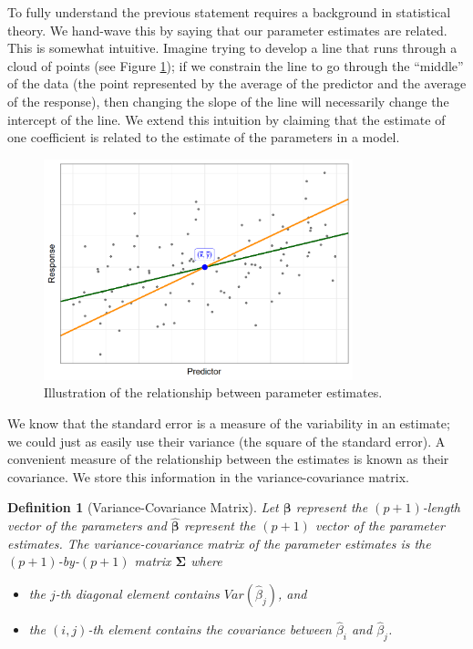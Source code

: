 \documentclass[
]{book}
\providecommand{\tightlist}{%
  \setlength{\itemsep}{0pt}\setlength{\parskip}{0pt}}
\theoremstyle{plain}
\theoremstyle{mydefn}
\newtheorem{definition}{Definition}[chapter]
\theoremstyle{myexmpl}
\theoremstyle{remark}
\begin{document}
To fully understand the previous statement requires a background in statistical theory. We hand-wave this by saying that our parameter estimates are related. This is somewhat intuitive. Imagine trying to develop a line that runs through a cloud of points (see Figure \ref{fig:glm-linear-hypotheses-line}); if we constrain the line to go through the ``middle'' of the data (the point represented by the average of the predictor and the average of the response), then changing the slope of the line will necessarily change the intercept of the line. We extend this intuition by claiming that the estimate of one coefficient is related to the estimate of the parameters in a model.

\begin{figure}

{\centering \includegraphics[width=0.8\textwidth]{./Images/glm-linear-hypotheses-line-1} 

}

\caption{Illustration of the relationship between parameter estimates.}\label{fig:glm-linear-hypotheses-line}
\end{figure}

We know that the standard error is a measure of the variability in an estimate; we could just as easily use their variance (the square of the standard error). A convenient measure of the relationship between the estimates is known as their covariance. We store this information in the variance-covariance matrix.

\begin{definition}[Variance-Covariance Matrix]

Let \(\boldsymbol{\beta}\) represent the \((p+1)\)-length vector of the parameters and \(\widehat{\boldsymbol{\beta}}\) represent the \((p+1)\) vector of the parameter \emph{estimates}. The variance-covariance matrix of the parameter estimates is the \((p+1)\)-by-\((p+1)\) matrix \(\boldsymbol{\Sigma}\) where

\begin{itemize}
\tightlist
\item
  the \(j\)-th diagonal element contains \(Var\left(\widehat{\beta}_j\right)\), and
\item
  the \((i,j)\)-th element contains the covariance between \(\widehat{\beta}_i\) and \(\widehat{\beta}_j\).
\end{itemize}

\end{definition}
\end{document}
